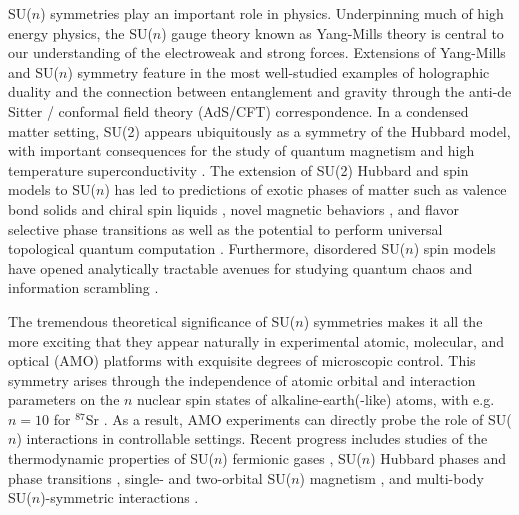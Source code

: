 \documentclass[aps,pra,nofootinbib,twocolumn,superscriptaddress]{revtex4-2}
\newcommand{\1}{\mathds{1}}
\begin{document}
SU($n$) symmetries play an important role in physics.
Underpinning much of high energy physics, the SU($n$) gauge theory known as Yang-Mills theory is central to our understanding of the electroweak and strong forces.
Extensions of Yang-Mills and SU($n$) symmetry feature in the most well-studied examples of holographic duality \cite{maldacena1999largen} and the connection between entanglement and gravity \cite{ryu2006holographic} through the anti-de Sitter / conformal field theory (AdS/CFT) correspondence.
In a condensed matter setting, SU(2) appears ubiquitously as a symmetry of the Hubbard model, with important consequences for the study of quantum magnetism and high temperature superconductivity \cite{lee2006doping}.
The extension of SU(2) Hubbard and spin models to SU($n$) has led to predictions of exotic phases of matter such as valence bond solids \cite{read1989valencebond, rokhsar1990quadratic, kaul2012lattice, hermele2011topological} and chiral spin liquids \cite{hermele2009mott, hermele2011topological, chen2016syntheticgaugefield, nataf2016chiral}, novel magnetic behaviors \cite{nataf2014exact, nataf2016exact}, and flavor selective phase transitions \cite{xu2018interaction, delre2018selective, tusi2021flavourselective, ibarra-garcia-padilla2021universal} as well as the potential to perform universal topological quantum computation \cite{freedman2004class, nayak2008nonabelian}.
Furthermore, disordered SU($n$) spin models have opened analytically tractable avenues for studying quantum chaos and information scrambling \cite{sachdev1993gapless}.

The tremendous theoretical significance of SU($n$) symmetries makes it all the more exciting that they appear naturally in experimental atomic, molecular, and optical (AMO) platforms with exquisite degrees of microscopic control.
This symmetry arises through the independence of atomic orbital and interaction parameters on the $n$ nuclear spin states of alkaline-earth(-like) atoms, with e.g.~$n=10$ for ${}^{87}$Sr \cite{wu2003exact, cazalilla2009ultracold, gorshkov2010twoorbital, cazalilla2014ultracold}.
As a result, AMO experiments can directly probe the role of SU($n$) interactions in controllable settings.
Recent progress includes studies of the thermodynamic properties of SU($n$) fermionic gases \cite{hazzard2012hightemperature, bonnes2012adiabatic, stellmer2013degenerate, yip2014theory, ibarra-garcia-padilla2021universal, pagano2014onedimensional, choudhury2020collective, song2020evidence, sonderhouse2020thermodynamics}, SU($n$) Hubbard phases and phase transitions \cite{taie2012su, hofrichter2016direct, taie2020observation}, single- \cite{messio2012entropy} and two-orbital SU($n$) magnetism \cite{cappellini2014direct, scazza2014observation, zhang2014spectroscopic, beverland2016realizing}, and multi-body SU($n$)-symmetric interactions \cite{goban2018emergence, perlin2019effective}.
\end{document}
